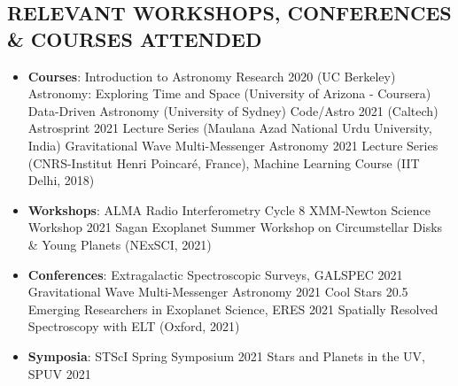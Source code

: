 \documentclass[11pt]{res} %
\newcommand{\sectgap}{0.05in} %
\begin{document}
\begin{resume}
\vspace{0.1in}
\hline


\section{RELEVANT WORKSHOPS, CONFERENCES \& COURSES ATTENDED}
\vspace{0.25in}
\begin{itemize}
\item \textbf{Courses}: \textbullet{} Introduction to Astronomy Research 2020 (UC Berkeley) \textbullet{} Astronomy: Exploring Time and Space (University of Arizona - Coursera) \textbullet{} Data-Driven Astronomy (University of Sydney) \textbullet{} Code/Astro 2021 (Caltech) \textbullet{} Astrosprint 2021 Lecture Series (Maulana Azad National Urdu University, India) \textbullet{} Gravitational Wave Multi-Messenger Astronomy 2021 Lecture Series (CNRS-Institut Henri Poincaré, France), Machine Learning Course (IIT Delhi, 2018)
\item \textbf{Workshops}: \textbullet{} ALMA Radio Interferometry Cycle 8 \textbullet{} XMM-Newton Science Workshop 2021 \textbullet{}Sagan Exoplanet Summer Workshop on Circumstellar Disks \& Young Planets (NExSCI, 2021)
\item \textbf{Conferences}: \textbullet{} Extragalactic Spectroscopic Surveys, GALSPEC 2021 \textbullet{} Gravitational Wave Multi-Messenger Astronomy 2021 \textbullet{} Cool Stars 20.5 \textbullet{} Emerging Researchers in Exoplanet Science, ERES 2021 \textbullet{} Spatially Resolved Spectroscopy with ELT (Oxford, 2021)
\item \textbf{Symposia}:  \textbullet{} STScI Spring Symposium 2021 \textbullet{} Stars and Planets in the UV, SPUV 2021
\end{itemize}
\vspace{\sectgap} 
\hline




\end{resume}
\end{document}

